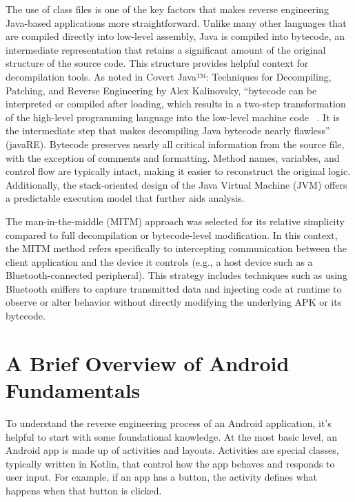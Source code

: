 The use of class files is one of the key factors that makes reverse engineering Java-based applications more straightforward. Unlike many other languages that are compiled directly into low-level assembly, Java is compiled into bytecode, an intermediate representation that retains a significant amount of the original structure of the source code. This structure provides helpful context for decompilation tools.
As noted in Covert Java™: Techniques for Decompiling, Patching, and Reverse Engineering by Alex Kalinovsky, “bytecode can be interpreted or compiled after loading, which results in a two-step transformation of the high-level programming language into the low-level machine code ~\cite{covertjava}. It is the intermediate step that makes decompiling Java bytecode nearly flawless” (javaRE). Bytecode preserves nearly all critical information from the source file, with the exception of comments and formatting. Method names, variables, and control flow are typically intact, making it easier to reconstruct the original logic. Additionally, the stack-oriented design of the Java Virtual Machine (JVM) offers a predictable execution model that further aids analysis.

The man-in-the-middle (MITM) approach was selected for its relative simplicity compared to full decompilation or bytecode-level modification. In this context, the MITM method refers specifically to intercepting communication between the client application and the device it controls (e.g., a host device such as a Bluetooth-connected peripheral). This strategy includes techniques such as using Bluetooth sniffers to capture transmitted data and injecting code at runtime to observe or alter behavior without directly modifying the underlying APK or its bytecode.


\section {A Brief Overview of Android Fundamentals}
To understand the reverse engineering process of an Android application, it’s helpful to start with some foundational knowledge. At the most basic level, an Android app is made up of activities and layouts. Activities are special classes, typically written in Kotlin, that control how the app behaves and responds to user input. For example, if an app has a button, the activity defines what happens when that button is clicked. 

